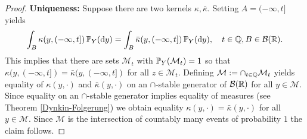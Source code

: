 \begin{proof}[Proof]
	\textbf{Uniqueness:}
	Suppose there are two kernels $\kappa, \bar \kappa$. Setting $A=(-\infty,t]$ yields
	\begin{align*}
		\int_B \kappa(y,(-\infty,t]) \, \P_Y(\mathrm d y)=\int_B \bar \kappa(y,(-\infty,t]) \, \P_Y(\mathrm dy),\quad t\in\Q, B\in \mathcal B(\R).
	\end{align*}
	This implies that there are sets $\mathcal M_t$ with $\P_Y(\mathcal M_t)=1$ so that $\kappa(y,(-\infty,t])=\bar \kappa(y,(-\infty,t])$ for all $z\in \mathcal M_t$. Defining $\mathcal M:=\cap_{t\in \Q} \mathcal M_t$ yields equality of $\kappa(y,\cdot )$ and $\bar \kappa(y,\cdot )$ on an $\cap$-stable generator of $\mathcal B(\R)$ for all $y\in \mathcal M$. Since equality on an $\cap$-stable generator implies equality of measures (see Theorem \ref{Dynkin-Folgerung}) we obtain equality $\kappa(y,\cdot)=\bar \kappa(y,\cdot)$ for all $y\in \mathcal M$. Since $\mathcal M$ is the intersection of countably many events of probability $1$ the claim follows.\smallskip
	

\end{proof}
